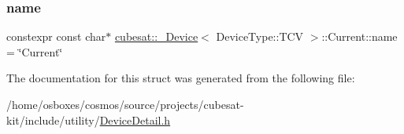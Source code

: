 \subsubsection{\texorpdfstring{name}{name}}
{\footnotesize\ttfamily constexpr const char$\ast$ \hyperlink{structcubesat_1_1__Device}{cubesat\+::\+\_\+\+Device}$<$ Device\+Type\+::\+T\+CV $>$\+::Current\+::name = \char`\"{}Current\char`\"{}\hspace{0.3cm}{\ttfamily [static]}}



The documentation for this struct was generated from the following file\+:\begin{DoxyCompactItemize}
\item 
/home/osboxes/cosmos/source/projects/cubesat-\/kit/include/utility/\hyperlink{DeviceDetail_8h}{Device\+Detail.\+h}\end{DoxyCompactItemize}
